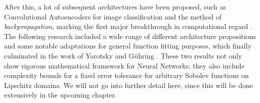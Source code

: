 After this, a lot of subsequent architectures have been proposed, such as Convolutional Autoencoders for
image classification and the method of \emph{backpropagation}, marking the first major breakthrough in 
computational regard \cite{lecun1989}. The following research included a wide range of different architecture propositions
and some notable adaptations for general function fitting purposes, which finally culminated in the
work of Yarotsky \cite{yarotsky2017nn} and Gühring \cite{gühring2019nn}. These two results not only show
rigorous mathematical framework for Neural Networks; they also include complexity bounds for a fixed error 
tolerance for arbitrary Sobolev functions on Lipschitz domains. We will not go into further detail here, 
since this will be done extensively in the upcoming chapter.